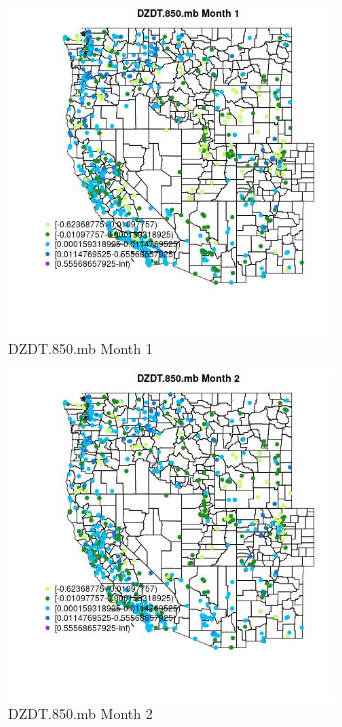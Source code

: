 \begin{figure} 
\centering  
\includegraphics[width=0.77\textwidth]{Code_Outputs/Report_ML_input_PM25_Step4_part_f_de_duplicated_aves_prioritize_24hr_obswNAs_MapObsMo1DZDT850mb.jpg} 
\caption{\label{fig:Report_ML_input_PM25_Step4_part_f_de_duplicated_aves_prioritize_24hr_obswNAsMapObsMo1DZDT850mb}DZDT.850.mb Month 1} 
\end{figure} 
 

\begin{figure} 
\centering  
\includegraphics[width=0.77\textwidth]{Code_Outputs/Report_ML_input_PM25_Step4_part_f_de_duplicated_aves_prioritize_24hr_obswNAs_MapObsMo2DZDT850mb.jpg} 
\caption{\label{fig:Report_ML_input_PM25_Step4_part_f_de_duplicated_aves_prioritize_24hr_obswNAsMapObsMo2DZDT850mb}DZDT.850.mb Month 2} 
\end{figure} 
 

